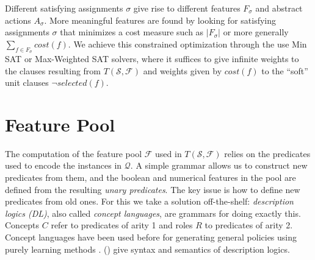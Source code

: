 \documentclass[letterpaper]{article} %
\newcommand{\Omit}[1]{}
\newcommand{\citeay}[1]{\citeauthor{#1} (\citeyear{#1})}
\newtheorem{theorem}[definition]{Theorem}
\newcommand{\Q}{\mathcal{Q}}
\newcommand{\F}{\mathcal{F}}
\renewcommand{\S}{\mathcal{S}}
\begin{document}
\Omit{
The goal expression $G_F$ can be provided explicitly  in terms of the primitive predicates,
but  more generally can be extracted  from the satisfying assigment $\sigma$ as well.
For this, $G_F = G_{\sigma}$ is defined as the DNF formula whose terms 
correspond to the abstract states over the selected features in $F_{\sigma}$ 
that are false in all expanded states in $\S$ marked as non-goals
and true in some expanded goal state. This DNF formula can   be simplified in standard ways. 
Due to  (\ref{eq:d1}) and (\ref{eq:goal}) that force the selected features in $F_{\sigma}$
to   distinguish goal  from non-goal states, we have that:

\begin{theorem}
For a satisfying assigment $\sigma$  of $T(\S,\F)$, 
$s$ is expanded goal   state in $\S$  iff  $s$ satisfies  $G_F=G_{\sigma}$.
\end{theorem}
}
Different satisfying assignments $\sigma$ give rise to different features $F_{\sigma}$
and abstract actions $A_{\sigma}$. More meaningful features are found by looking for
satisfying assignments $\sigma$ that minimizes a cost measure such as $|F_{\sigma}|$
or more generally $\sum_{f \in F_{\sigma}} cost(f)$. We achieve this constrained
optimization through the use Min SAT or Max-Weighted SAT solvers, where it suffices
to give infinite weights to the clauses resulting from $T(\S,\F)$ and weights
given by $cost(f)$ to the ``soft'' unit clauses $\neg selected(f)$.


\section{Feature Pool}

The computation of the feature pool $\F$ used in $T(\S,\F)$
relies on the predicates used to encode the instances in $\Q$.
A simple grammar allows  us   to construct new predicates from them, 
and the boolean and numerical features in the pool
are defined from the resulting \emph{unary predicates}. 
The key issue is how to define new predicates from old  ones. For this 
we take a solution off-the-shelf: \emph{description logics (DL)},  also called
\emph{concept languages},  are grammars for doing exactly this.
Concepts $C$  refer  to predicates of arity 1 and roles $R$  to predicates of arity 2.
Concept languages have been used before for  generating general policies using purely learning methods  \cite{martin:concept,fern:bias}.
\citeay{dl-handbook} give syntax and semantics of description logics.
\end{document}
